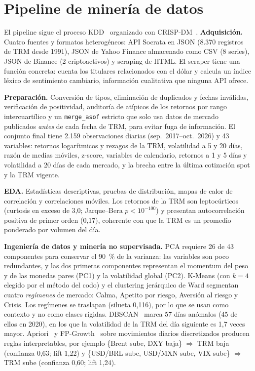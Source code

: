 \documentclass[conference]{IEEEtran}
\begin{document}
\section{Pipeline de minería de datos}
El pipeline sigue el proceso KDD~\cite{fayyad1996} organizado con CRISP-DM~\cite{wirth2000}. \textbf{Adquisición.} Cuatro fuentes y formatos heterogéneos: API Socrata en JSON (8.370 registros de TRM desde 1991), JSON de Yahoo Finance almacenado como CSV (8 series), JSON de Binance (2 criptoactivos) y scraping de HTML. El scraper tiene una función concreta: cuenta los titulares relacionados con el dólar y calcula un índice léxico de sentimiento cambiario, información cualitativa que ninguna API ofrece.

\textbf{Preparación.} Conversión de tipos, eliminación de duplicados y fechas inválidas, verificación de positividad, auditoría de atípicos de los retornos por rango intercuartílico y un \texttt{merge\_asof} estricto que solo usa datos de mercado publicados \emph{antes} de cada fecha de TRM, para evitar fuga de información. El conjunto final tiene 2.159 observaciones diarias (sep.~2017--oct.~2026) y 43 variables: retornos logarítmicos y rezagos de la TRM, volatilidad a 5 y 20 días, razón de medias móviles, z-score, variables de calendario, retornos a 1 y 5 días y volatilidad a 20 días de cada mercado, y la brecha entre la última cotización spot y la TRM vigente.

\textbf{EDA.} Estadísticas descriptivas, pruebas de distribución, mapas de calor de correlación y correlaciones móviles. Los retornos de la TRM son leptocúrticos (curtosis en exceso de 3,0; Jarque--Bera $p<10^{-100}$) y presentan autocorrelación positiva de primer orden (0,17), coherente con que la TRM es un promedio ponderado por volumen del día.

\textbf{Ingeniería de datos y minería no supervisada.} PCA requiere 26 de 43 componentes para conservar el 90~\% de la varianza: las variables son poco redundantes, y las dos primeras componentes representan el momentum del peso y de las monedas pares (PC1) y la volatilidad global (PC2). K-Means (con $k=4$ elegido por el método del codo) y el clustering jerárquico de Ward segmentan cuatro \emph{regímenes} de mercado: Calma, Apetito por riesgo, Aversión al riesgo y Crisis. Los regímenes se traslapan (silueta 0,116), por lo que se usan como contexto y no como clases rígidas. DBSCAN~\cite{ester1996} marca 57 días anómalos (45 de ellos en 2020), en los que la volatilidad de la TRM del día siguiente es 1,7 veces mayor. Apriori~\cite{agrawal1994} y FP-Growth~\cite{han2000} sobre movimientos diarios discretizados producen reglas interpretables, por ejemplo \{Brent sube, DXY baja\} $\Rightarrow$ TRM baja (confianza 0,63; lift 1,22) y \{USD/BRL sube, USD/MXN sube, VIX sube\} $\Rightarrow$ TRM sube (confianza 0,60; lift 1,24).
\end{document}
